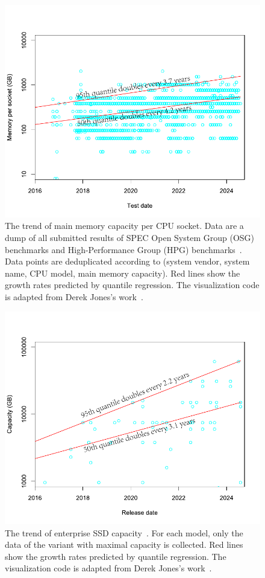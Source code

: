 \begin{figure}[]
    \centering
    \includegraphics[width=0.8\linewidth]{figures/Intro/MainMemTrend.pdf}
    \caption{The trend of main memory capacity per CPU socket. Data are a dump of all submitted results of SPEC Open System Group (OSG) benchmarks and High-Performance Group (HPG) benchmarks~\cite{specAllSPECOSG2024}. Data points are deduplicated according to (system vendor, system name, CPU model, main memory capacity). Red lines show the growth rates predicted by quantile regression.  The visualization code is adapted from Derek Jones's work~\cite{derekjonesShapeCodeMemory2020}. }
    \label{fig:main_mem_trend}
\end{figure}

\begin{figure}[]
    \centering
    \includegraphics[width=0.8\linewidth]{figures/Intro/SSDTrend.pdf}
    \caption{The trend of enterprise SSD capacity~\cite{techpowerupEnterpriseSSDDatabase2024}. For each model, only the data of the variant with maximal capacity is collected. Red lines show the growth rates predicted by quantile regression.  The visualization code is adapted from Derek Jones's work~\cite{derekjonesShapeCodeMemory2020}. }
    \label{fig:ssd_trend}
\end{figure}



